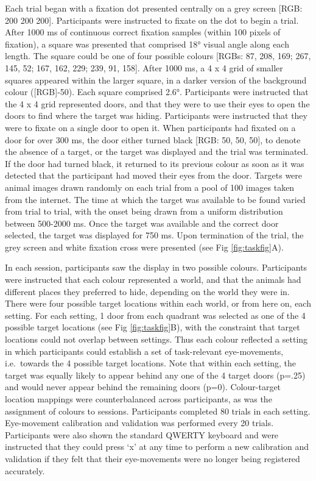 \documentclass[
  man]{apa6}
\begin{document}
\label{sec:Experimental Task}

Each trial began with a fixation dot presented centrally on a grey screen {[}RGB: 200 200 200{]}. Participants were instructed to fixate on the dot to begin a trial. After 1000 ms of continuous correct fixation samples (within 100 pixels of fixation), a square was presented that comprised 18° visual angle along each length. The square could be one of four possible colours {[}RGBs: 87, 208, 169; 267, 145, 52; 167, 162, 229; 239, 91, 158{]}. After 1000 ms, a 4 x 4 grid of smaller squares appeared within the larger square, in a darker version of the background colour ({[}RGB{]}-50). Each square comprised 2.6°. Participants were instructed that the 4 x 4 grid represented doors, and that they were to use their eyes to open the doors to find where the target was hiding. Participants were instructed that they were to fixate on a single door to open it. When participants had fixated on a door for over 300 ms, the door either turned black {[}RGB: 50, 50, 50{]}, to denote the absence of a target, or the target was displayed and the trial was terminated. If the door had turned black, it returned to its previous colour as soon as it was detected that the participant had moved their eyes from the door. Targets were animal images drawn randomly on each trial from a pool of 100 images taken from the internet. The time at which the target was available to be found varied from trial to trial, with the onset being drawn from a uniform distribution between 500-2000 ms. Once the target was available and the correct door selected, the target was displayed for 750 ms. Upon termination of the trial, the grey screen and white fixation cross were presented (see Fig \ref{fig:taskfig}A).

In each session, participants saw the display in two possible colours. Participants were instructed that each colour represented a world, and that the animals had different places they preferred to hide, depending on the world they were in. There were four possible target locations within each world, or from here on, each setting. For each setting, 1 door from each quadrant was selected as one of the 4 possible target locations (see Fig \ref{fig:taskfig}B), with the constraint that target locations could not overlap between settings. Thus each colour reflected a setting in which participants could establish a set of task-relevant eye-movements, i.e.~towards the 4 possible target locations. Note that within each setting, the target was equally likely to appear behind any one of the 4 target doors (p=.25) and would never appear behind the remaining doors (p=0). Colour-target location mappings were counterbalanced across participants, as was the assignment of colours to sessions. Participants completed 80 trials in each setting. Eye-movement calibration and validation was performed every 20 trials. Participants were also shown the standard QWERTY keyboard and were instructed that they could press `x' at any time to perform a new calibration and validation if they felt that their eye-movements were no longer being registered accurately.
\end{document}
